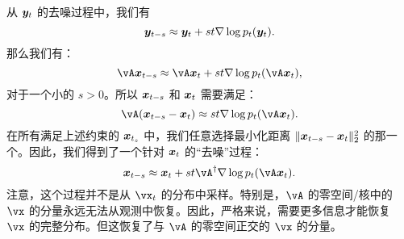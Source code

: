 \documentclass[../../book-main.tex]{subfiles}
\begin{document}
从 $\bm{y}_t$ 的去噪过程中，我们有
\begin{equation}
    \bm{y}_{t-s} \approx  \bm{y}_t + st \nabla \log p_t(\bm{y}_t).
\end{equation}
那么我们有：
\begin{equation}
    \vA\x_{t-s} \approx   \vA\x_t + st \nabla \log p_t(\vA \x_t),
\end{equation}
对于一个小的 $s >0$。所以 $\bm{x}_{t-s}$ 和 $\bm{x}_t$ 需要满足：
\begin{equation}
    \vA(\x_{t-s} - \x_t) \approx st \nabla \log p_t(\vA\x_t). 
\end{equation}
在所有满足上述约束的 $\bm{x}_{t_s}$ 中，我们任意选择最小化距离 $\|\bm{x}_{t-s} - \bm{x}_t\|_2^2$ 的那一个。因此，我们得到了一个针对 $\bm{x}_t$ 的“去噪”过程：
\begin{equation}
    \x_{t-s}  \approx \x_t + st\vA^\dagger \nabla \log p_t(\vA\x_t). 
\label{eqn:denoising-projection}
\end{equation}
注意，这个过程并不是从 $\vx_t$ 的分布中采样。特别是，$\vA$ 的零空间/核中的 $\vx$ 的分量永远无法从观测中恢复。因此，严格来说，需要更多信息才能恢复 $\vx$ 的完整分布。但这恢复了与 $\vA$ 的零空间正交的 $\vx$ 的分量。

\end{document}
